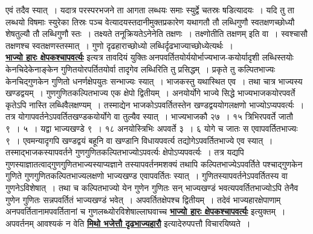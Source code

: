 \documentclass[11pt, openany]{book}
\begin{document}
{{ एवं तदैव स्यात्~। यदात्र परस्परभजने ता आगता लब्धयः समाः स्युर्द्वे 
चतस्रः षडित्यादयः~। यदि तु ता लब्धयो विषमाः स्युरेका तिस्रः पञ्च 
वेत्यादयस्तदानीमुक्तप्रकारेण यथागतौ तौ लब्धिगुणौ स्वतक्षणच्छोध्यौ
शेषतुल्यौ तौ लब्धिगुणौ स्तः~। तक्ष्यते तनूक्रियतेऽनेनेति तक्षणः~। तक्ष्णोतीति तक्षणम्
इति वा~।
स्वश्चासौ तक्षणश्च स्वतक्षणस्तस्मात्~। गुणो दृढहाराच्छोध्यो
लब्धिर्दृढभाज्याच्छोध्येत्यर्थः~।\\

\vspace{-4mm}
\hyperref[50]{\textbf{भाज्यो हारः क्षेपकश्चापवर्त्यः}} इत्यत्र तावदियं
युक्तिः\textendash \,अनपवर्तितयोर्ययोर्भाज्यभाज-कयोर्यादृशी लब्धिस्तयोः केनचिदेकेनाङ्केन गुणितयोरपर्तितयोर्वा तादृगेव
लब्धिरिति तु  प्रसिद्धम्~। प्रकृते तु कल्पितभाज्यः केनचिद्गुणकेन गुणितो
धनर्णक्षेपयुतः सन्भाज्यः 
 स्यात्~। भाजकस्तु यथास्थित एव~। तथा चात्र भाज्यस्य खण्डद्वयम्~।
गुणगुणितकल्पितभाज्य एक क्षेपो द्वितीयम्~। अनयोर्योगे भाज्ये सिद्धे
भाज्यभाजकयोरपवर्ते 
कृतेऽपि नास्ति लब्धिवैलक्षण्यम्~। तस्माद्येन भाजकोऽपवर्तितस्तेन 
खण्डद्वययोगलक्षणो भाज्योऽप्यपवर्त्यः~। तत्र
योगापवर्तनेऽपवर्तितखण्डकयोर्योगे 
वा तुल्यैव स्यात्~। भाज्यभाजकौ २७~। १५ त्रिभिरपवर्ते जातौ ९~। ५~।
यद्वा 
भाज्यखण्डे ९~। १८ अनयोस्त्रिभिः अपवर्ते ३~। ६ योगे च जातः स
एवापवर्तितभाज्यः 
९~। एवमन्यादृगपि  खण्डद्वयं बहूनि वा खण्डानि विधायपवर्त्य
तद्योगेऽपवर्तितभाज्ये 
एव स्यात्~। तस्माद्भाजकस्यापवर्तने गुणगुणितकल्पितभाज्योऽपवर्त्यः
क्षेपोऽप्यपवर्त्यः~। 
तत्र यद्यपि गुणस्याज्ञातत्वाद्गुणगुणितभाज्यस्याप्यज्ञाने
तस्यापवर्तनमशक्यं तथापि
\newpage
\noindent कल्पितभाज्येऽपवर्तिते पश्चाद्गुणकेन गुणिते गुणगुणितकल्पितभाज्यलक्षणो
भाज्यखण्ड एवापवर्तितः स्यात्~। गुणितस्यापवर्तनेऽपवर्तितस्य वा
गुणनेऽविशेषात्~। तथा च कल्पितभाज्यो येन गुणेन गुणितः सन् भाज्यखण्डं
भवत्यपवर्तितभाज्योऽपि 
तेनैव गुणेन गुणितः सन्नपवर्तितं भाज्यखण्डं भवेत्~। अपवर्तितक्षेपश्च
द्वितीयम्~। 
तदेवं भाज्यहारक्षेपाणाम् अनपवर्तितानामपवर्तितानां च
गुणलब्ध्योरविशेषाल्लाघवाच्च 
\hyperref[50]{\textbf{भाज्यो हारः क्षेपकश्चापवर्त्यः}} इत्युक्तम्~। अपवर्तनम् आवश्यकं न वेति \hyperref[51]{\textbf{मिथो भजेत्तौ दृढभाज्यहारौ}} इत्यादेरुपपत्तौ विचारयिष्यते~।\\

}}
\end{document}
